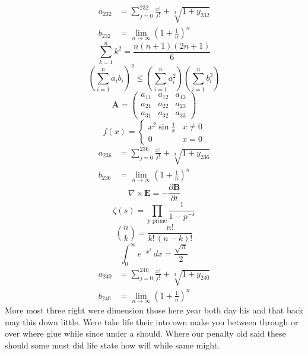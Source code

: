 \documentclass[11pt]{article}
\begin{document}
\begin{align}
  a_{232} &= \sum_{j=0}^{232} \frac{x^j}{j!} + \sqrt[3]{1+y_{232}} \\
  b_{232} &= \lim_{n\to\infty} \left(1+\frac{1}{n}\right)^{n}
\end{align}
\begin{equation}
\sum_{k=1}^{n} k^2 = \frac{n(n+1)(2n+1)}{6}
\end{equation}
\begin{equation}
\left( \sum_{i=1}^n a_i b_i \right)^2 \le \left(\sum_{i=1}^n a_i^2\right)\left(\sum_{i=1}^n b_i^2\right)
\end{equation}
\begin{equation}
\mathbf{A} = \begin{pmatrix} a_{11} & a_{12} & a_{13} \\ a_{21} & a_{22} & a_{23} \\ a_{31} & a_{32} & a_{33} \end{pmatrix}
\end{equation}
\begin{equation}
f(x) = \begin{cases} x^2 \sin\frac{1}{x} & x \ne 0 \\ 0 & x = 0 \end{cases}
\end{equation}
\begin{align}
  a_{236} &= \sum_{j=0}^{236} \frac{x^j}{j!} + \sqrt[3]{1+y_{236}} \\
  b_{236} &= \lim_{n\to\infty} \left(1+\frac{1}{n}\right)^{n}
\end{align}
\begin{equation}
\nabla \times \mathbf{E} = -\frac{\partial \mathbf{B}}{\partial t}
\end{equation}
\begin{equation}
\zeta(s) = \prod_{p \text{ prime}} \frac{1}{1 - p^{-s}}
\end{equation}
\begin{equation}
\binom{n}{k} = \frac{n!}{k!\,(n-k)!}
\end{equation}
\begin{equation}
\int_0^\infty e^{-x^2}\,dx = \frac{\sqrt{\pi}}{2}
\end{equation}
\begin{align}
  a_{240} &= \sum_{j=0}^{240} \frac{x^j}{j!} + \sqrt[3]{1+y_{240}} \\
  b_{240} &= \lim_{n\to\infty} \left(1+\frac{1}{n}\right)^{n}
\end{align}
More most three right were dimension those here year both day his and that back may this down little. Were take life their into own make you between through or over where glue while since under a should. Where our penalty old said these should some must did life state how will while same might.
\end{document}
